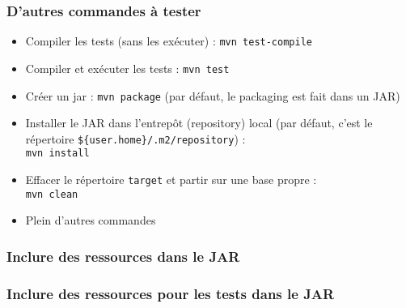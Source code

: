 \documentclass{beamer}
\begin{document}
\begin{frame}[fragile]
  \frametitle{D'autres commandes à tester}
  \begin{itemize}
  \item Compiler les tests (sans les exécuter) : \texttt{mvn test-compile}
  \item Compiler et exécuter les tests : \texttt{mvn test}
  \item Créer un jar : \texttt{mvn package} (par défaut, le packaging
    est fait dans un JAR)
  \item Installer le JAR dans l'entrepôt (repository) local (par défaut,
    c'est le répertoire \texttt{\$\{user.home\}/.m2/repository}) :\\ 
    \texttt{mvn install}
  \item Effacer le répertoire \texttt{target} et partir sur une base
    propre :\\ \texttt{mvn clean}
  \item Plein d'autres commandes 
    
  \end{itemize}  
\end{frame}

\begin{frame}[fragile]
  \frametitle{Inclure des ressources dans le JAR}
\end{frame}

\begin{frame}[fragile]
  \frametitle{Inclure des ressources pour les tests dans le JAR}
\end{frame}
\end{document}
